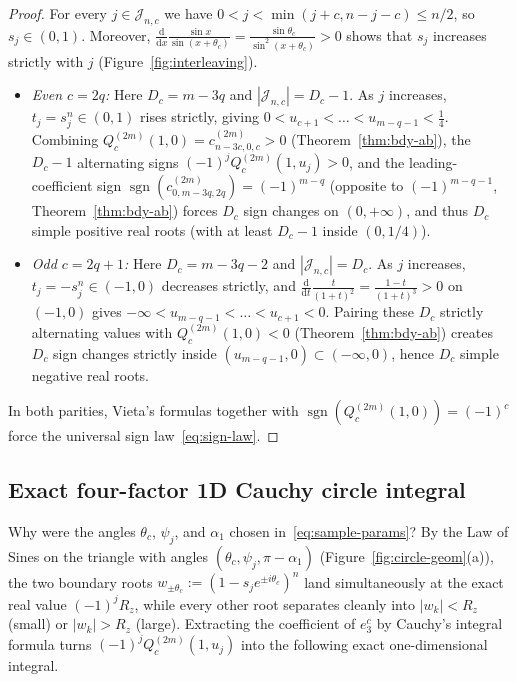 \documentclass[10pt]{article}
\numberwithin{equation}{section}
\theoremstyle{plain}
\theoremstyle{definition}
\newcommand{\dd}{\mathrm{d}}
\newcommand{\1}{\mathbf{1}}
\DeclareMathOperator{\sgn}{sgn}
\begin{document}
\begin{proof}
For every $j \in \mathcal{J}_{n,c}$ we have $0 < j < \min(j + c, n - j - c) \le n/2$, so $s_j \in (0, 1)$. Moreover, $\frac{\dd}{\dd x}\frac{\sin x}{\sin(x + \theta_c)} = \frac{\sin\theta_c}{\sin^2(x + \theta_c)} > 0$ shows that $s_j$ increases strictly with $j$ (Figure~\ref{fig:interleaving}).
\begin{itemize}[leftmargin=1.5em]
    \item \emph{Even $c = 2q$:} Here $D_c = m - 3q$ and $|\mathcal{J}_{n, c}| = D_c - 1$. As $j$ increases, $t_j = s_j^n \in (0, 1)$ rises strictly, giving $0 < u_{c+1} < \dots < u_{m-q-1} < \frac{1}{4}$. Combining $Q_c^{(2m)}(1, 0) = c_{n-3c,0,c}^{(2m)} > 0$ (Theorem~\ref{thm:bdy-ab}), the $D_c - 1$ alternating signs $(-1)^j Q_c^{(2m)}(1, u_j) > 0$, and the leading-coefficient sign $\sgn(c_{0, m-3q, 2q}^{(2m)}) = (-1)^{m-q}$ (opposite to $(-1)^{m-q-1}$, Theorem~\ref{thm:bdy-ab}) forces $D_c$ sign changes on $(0, +\infty)$, and thus $D_c$ simple positive real roots (with at least $D_c - 1$ inside $(0, 1/4)$).
    \item \emph{Odd $c = 2q + 1$:} Here $D_c = m - 3q - 2$ and $|\mathcal{J}_{n, c}| = D_c$. As $j$ increases, $t_j = -s_j^n \in (-1, 0)$ decreases strictly, and $\frac{\dd}{\dd t}\frac{t}{(1+t)^2} = \frac{1-t}{(1+t)^3} > 0$ on $(-1, 0)$ gives $-\infty < u_{m-q-1} < \dots < u_{c+1} < 0$. Pairing these $D_c$ strictly alternating values with $Q_c^{(2m)}(1, 0) < 0$ (Theorem~\ref{thm:bdy-ab}) creates $D_c$ sign changes strictly inside $(u_{m-q-1}, 0) \subset (-\infty, 0)$, hence $D_c$ simple negative real roots.
\end{itemize}
In both parities, Vieta's formulas together with $\sgn(Q_c^{(2m)}(1, 0)) = (-1)^c$ force the universal sign law~\eqref{eq:sign-law}.
\end{proof}

\subsection{Exact four-factor 1D Cauchy circle integral}
\label{sec:circle-integral}

Why were the angles $\theta_c$, $\psi_j$, and $\alpha_1$ chosen in~\eqref{eq:sample-params}? By the Law of Sines on the triangle with angles $(\theta_c, \psi_j, \pi - \alpha_1)$ (Figure~\ref{fig:circle-geom}(a)), the two boundary roots $w_{\pm\theta_c} := (1 - s_j e^{\pm i\theta_c})^n$ land simultaneously at the exact real value $(-1)^j R_z$, while every other root separates cleanly into $|w_k| < R_z$ (small) or $|w_k| > R_z$ (large). Extracting the coefficient of $e_3^c$ by Cauchy's integral formula turns $(-1)^j Q_c^{(2m)}(1, u_j)$ into the following exact one-dimensional integral.
\end{document}
